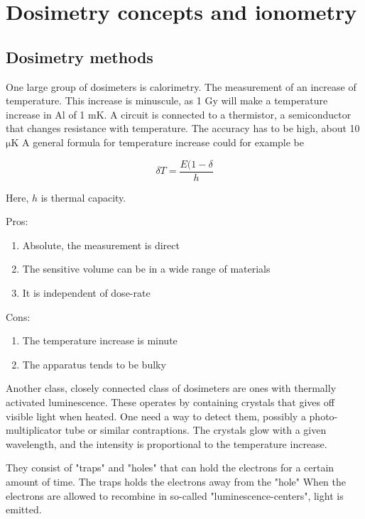 \section{Dosimetry concepts and ionometry}

\subsection{Dosimetry methods}

One large group of dosimeters is calorimetry. 
The measurement of an increase of temperature.
This increase is minuscule, as 1 Gy will make a temperature increase in Al of 1 mK.
A circuit is connected to a thermistor, a semiconductor that changes resistance with temperature.
The accuracy has to be high, about 10 $\mathrm{\mu}$K
A general formula for temperature increase could for example be 

\begin{equation}
    \delta T = \frac{E(1-\delta}{h}
\end{equation}

Here, $h$ is thermal capacity.

Pros:

\begin{enumerate}
    \item
        Absolute, the measurement is direct
    \item
        The sensitive volume can be in a wide range of materials
    \item
        It is independent of dose-rate
\end{enumerate}

Cons:

\begin{enumerate}
    \item
        The temperature increase is minute
    \item
        The apparatus tends to be bulky
\end{enumerate}

Another class, closely connected class of dosimeters are ones with thermally activated luminescence. 
These operates by containing crystals that gives off visible light when heated.
One need a way to detect them, possibly a photo-multiplicator tube or similar contraptions. 
The crystals glow with a given wavelength, and the intensity is proportional to the temperature increase. 

They consist of "traps" and "holes" that can hold the electrons for a certain amount of time. 
The traps holds the electrons away from the "hole"
When the electrons are allowed to recombine in so-called "luminescence-centers", light is emitted. 

